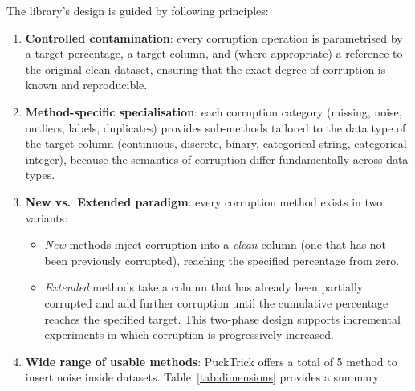 \documentclass[../main.tex]{subfiles}
\begin{document}
The library's design is guided by following principles:
\begin{enumerate}
    \item \textbf{Controlled contamination}: every corruption operation is
          parametrised by a target percentage, a target column, and (where
          appropriate) a reference to the original clean dataset, ensuring
          that the exact degree of corruption is known and reproducible.
    \item \textbf{Method-specific specialisation}: each corruption category
          (missing, noise, outliers, labels, duplicates) provides sub-methods
          tailored to the data type of the target column (continuous, discrete,
          binary, categorical string, categorical integer), because the
          semantics of corruption differ fundamentally across data types.
    \item \textbf{New vs.\ Extended paradigm}: every corruption method exists
          in two variants:
          \begin{itemize}
              \item \emph{New} methods inject corruption into a \emph{clean}
                    column (one that has not been previously corrupted), reaching
                    the specified percentage from zero.
              \item \emph{Extended} methods take a column that has already been
                    partially corrupted and add further corruption until the
                    cumulative percentage reaches the specified target.  This
                    two-phase design supports incremental experiments in which
                    corruption is progressively increased.
          \end{itemize}

    \newpage
    \item \textbf{Wide range of usable methods}: PuckTrick offers a total of 5 method to insert noise inside datasets. Table~\ref{tab:dimensions} provides a summary:


\end{enumerate}
\end{document}
